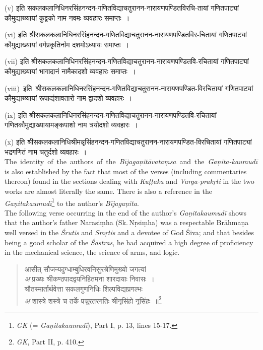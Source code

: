 \documentclass[11pt, openany]{book}
\begin{document}
(v) इति सकलकलानिधिनरसिंहनन्दन-गणितविद्याचतुरानन-नारायणपण्डितविरचि-तायां गणितपाट्यां कौमुद्याख्यायां कुट्टको नाम नवमः व्यवहारः समाप्तः~।
\vspace{2mm}

(vi) इति श्रीसकलकलानिधिनरसिंहनन्दन-गणितविद्याचतुरानन-नारायणपण्डितविर-चितायां गणितपाट्यां कौमुद्याख्यायां वर्गप्रकृतिर्नाम दशमोऽध्यायः समाप्तः~।
\vspace{2mm}

(vii) इति श्रीसकलकलानिधिनरसिंहनन्दन-गणितविद्याचतुरानन-नारायणपण्डितवि-रचितायां गणितपाट्यां कौमुद्याख्यायां भागादानं नामैकादशो व्यवहारः समाप्तः~।

\newpage
(viii) \,इति \,श्रीसकलकलानिधिनरसिंहनन्दन-गणितविद्याचतुरानन-नारायणपण्डित-विरचितायां गणितपाट्यां कौमुद्याख्यायां रूपाद्यंशावतारो नाम द्वादशो व्यवहारः~।
\vspace{2mm}

(ix) इति श्रीसकलकलानिधिनरसिंहनन्दन-गणितविद्याचतुरानन-नारायणपण्डितवि-रचितायां गणितकौमुद्याख्यायामङ्कपाशो नाम त्रयोदशो व्यवहारः~।
\vspace{2mm}

(x) इति श्रीसकलकलानिधिश्रीमन्नृसिंहनन्दन-गणितविद्याचतुरानन-नारायणपण्डित-विरचितायां गणितपाट्यां भद्रगणितं नाम चतुर्दशो व्यवहारः~। \\

The \,identity \,of \,the \,authors \,of \,the \,\textit{Bījagaṇitāvataṃsa} \,and \,the \,\textit{Gaṇita-kaumudī} is also established by the fact that most of the verses (including commentaries thereon) found in the sections dealing with \textit{Kuṭṭaka} and \textit{Varga-prakṛti} in the two works are almost literally the same. There is also a reference in the \textit{Gaṇitakaumudī}\footnote{\textit{GK} (= \textit{Gaṇitakaumudī}), Part I, p. 13, lines 15-17.} to the author's \textit{Bījagaṇita}.\\

The following verse occurring in the end of the author's \textit{Gaṇitakaumudī} shows that the author's father Narasiṃha (Sk.\,Nṛsiṃha) was a respectable Brāhmaṇa well versed in the \textit{Śrutis} and \textit{Smṛtis} and a devotee of God Śiva; and that besides being a good scholar of the \textit{Śāstras}, he had acquired a high degree of proficiency in the mechanical science, the science of arms, and logic.

\begin{quote}
{\color{violet}आसीत् सौजन्यदुग्धाम्बुधिरवनिसुरश्रेणिमुख्यो जगत्यां\\
\emph{\color{white}अ} \hspace{4mm} प्रख्यः श्रीकण्ठपादद्वयनिहितमना शारदायाः निवासः~।\\
श्रौतस्मार्तार्थवेत्ता सकलगुणनिधिः शिल्पविद्याप्रगल्भः\\
\emph{\color{white}अ} \hspace{4mm} शास्त्रे शस्त्रे च तर्के प्रचुरतरगतिः श्रीनृसिंहो नृसिंहः~॥}\footnote{\textit{GK}, Part II, p. 410.}
\end{quote}
\end{document}
